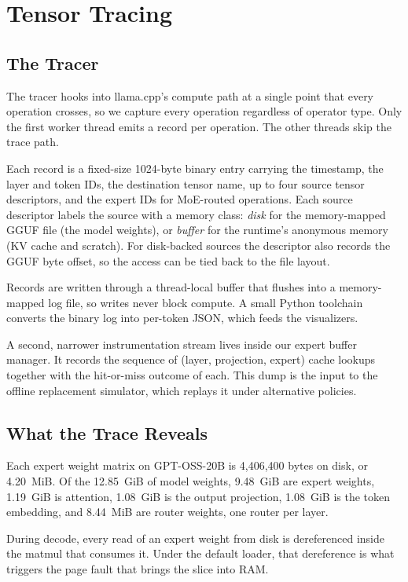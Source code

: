 \chapter{Tensor Tracing}\label{chapter:tracer}

\section{The Tracer}\label{sec:tracer-design}

The tracer hooks into llama.cpp's compute path at a single point that every operation crosses, so we capture every operation regardless of operator type.
Only the first worker thread emits a record per operation.
The other threads skip the trace path.

Each record is a fixed-size 1024-byte binary entry carrying the timestamp, the layer and token IDs, the destination tensor name, up to four source tensor descriptors, and the expert IDs for MoE-routed operations.
Each source descriptor labels the source with a memory class: \emph{disk} for the memory-mapped GGUF file (the model weights), or \emph{buffer} for the runtime's anonymous memory (KV cache and scratch).
For disk-backed sources the descriptor also records the GGUF byte offset, so the access can be tied back to the file layout.

Records are written through a thread-local buffer that flushes into a memory-mapped log file, so writes never block compute.
A small Python toolchain converts the binary log into per-token JSON, which feeds the visualizers.

A second, narrower instrumentation stream lives inside our expert buffer manager.
It records the sequence of (layer, projection, expert) cache lookups together with the hit-or-miss outcome of each.
This dump is the input to the offline replacement simulator, which replays it under alternative policies.


\section{What the Trace Reveals}\label{sec:tracer-findings}

Each expert weight matrix on GPT-OSS-20B is 4{,}406{,}400 bytes on disk, or 4.20~MiB.
Of the 12.85~GiB of model weights, 9.48~GiB are expert weights, 1.19~GiB is attention, 1.08~GiB is the output projection, 1.08~GiB is the token embedding, and 8.44~MiB are router weights, one router per layer.

During decode, every read of an expert weight from disk is dereferenced inside the matmul that consumes it.
Under the default loader, that dereference is what triggers the page fault that brings the slice into RAM.

